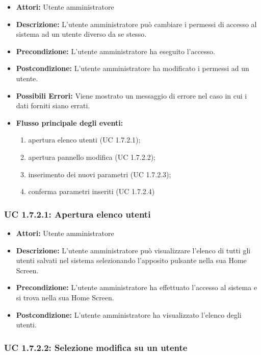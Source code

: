 \begin{itemize}
    \item \textbf{Attori:} Utente amministratore
    \item \textbf{Descrizione:} L'utente amministratore può cambiare i permessi di accesso al sistema ad un utente diverso da se stesso.
    \item \textbf{Precondizione:} L'utente amministratore ha eseguito l'accesso.
    \item \textbf{Postcondizione:} L'utente amministratore ha modificato i permessi ad un utente.
    \item \textbf{Possibili Errori:}
    Viene mostrato un messaggio di errore nel caso in cui i dati forniti siano errati.
    \item \textbf{Flusso principale degli eventi:}

    \begin{enumerate}
        \item apertura elenco utenti (UC 1.7.2.1);
        \item apertura pannello modifica (UC 1.7.2.2);
        \item inserimento dei nuovi parametri (UC 1.7.2.3);
        \item conferma parametri inseriti (UC 1.7.2.4)
    \end{enumerate}
    
\end{itemize}

\subsubsection{UC 1.7.2.1: Apertura elenco utenti}

\begin{itemize}
    \item \textbf{Attori:} Utente amministratore
    \item \textbf{Descrizione:} L'utente amministratore può visualizzare l'elenco di tutti gli utenti salvati nel sistema selezionando l'apposito pulsante nella sua Home Screen.
    \item \textbf{Precondizione:} L'utente amministratore ha effettuato l'accesso al sistema e si trova nella sua Home Screen.
    \item \textbf{Postcondizione:} L'utente amministratore ha visualizzato l'elenco degli utenti.
\end{itemize}

\subsubsection{UC 1.7.2.2: Selezione modifica su un utente}

